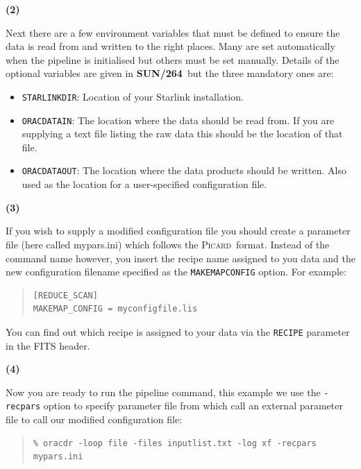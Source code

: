\documentclass[twoside,11pt]{article}
\newcommand{\xref}[3]{#1}
\renewcommand{\_}{\texttt{\symbol{95}}}
\newenvironment{myquote}{\begin{quote}\begin{small}}{\end{small}\end{quote}}
\newcommand{\picard}{\xref{\textsc{Picard}}{sun265}{}}
\newcommand{\param}[1]{\texttt{#1}}
\newcommand{\pipelinesun}{\xref{\textbf{SUN/264}}{sun264}{}}
\begin{document}
\begin{minipage}[t]{0.05\linewidth}
\textbf{(2)}
\end{minipage}
\begin{minipage}[t]{0.95\linewidth}
Next there are a few environment variables that must be defined to
ensure the data is read from and written to the right places. Many are
set automatically when the pipeline is initialised but others must be
set manually. Details of the optional variables are given in
\pipelinesun\ but the three mandatory ones are:
\begin{itemize}\itemsep-0.1em
\item \param{STARLINK\_DIR}: Location of your Starlink installation.
\item \param{ORAC\_DATA\_IN}: The location where the data should be read from.
If you are supplying a text file listing the raw data this should be the
location of that file.
\item \param{ORAC\_DATA\_OUT}: The location where the data products should be
written. Also used as the location for a user-specified configuration file.\\
\end{itemize}
\end{minipage}

\begin{minipage}[t]{0.05\linewidth}
\textbf{(3)}
\end{minipage}
\begin{minipage}[t]{0.95\linewidth}
If you wish to supply a modified configuration file you should create
a parameter file (here called mypars.ini) which follows the \picard\
format. Instead of the command name however, you insert the recipe
name assigned to you data and the new configuration filename specified
as the \texttt{MAKEMAP\_CONFIG} option. For example:
\begin{myquote}
\begin{verbatim}
[REDUCE_SCAN]
MAKEMAP_CONFIG = myconfigfile.lis
 \end{verbatim}
\end{myquote}
\end{minipage}
You can find out which recipe is assigned to your data via the
\texttt{RECIPE} parameter in the FITS header.

\begin{minipage}[t]{0.05\linewidth}
\textbf{(4)}
\end{minipage}
\begin{minipage}[t]{0.95\linewidth}
Now you are ready to run the pipeline command, this example we use the
\texttt{-recpars} option to specify parameter file from which call an
external parameter file to call our modified configuration file:
\begin{myquote}
\begin{verbatim}
% oracdr -loop file -files inputlist.txt -log xf -recpars mypars.ini
\end{verbatim}
\end{myquote}
\end{minipage}
\end{document}
